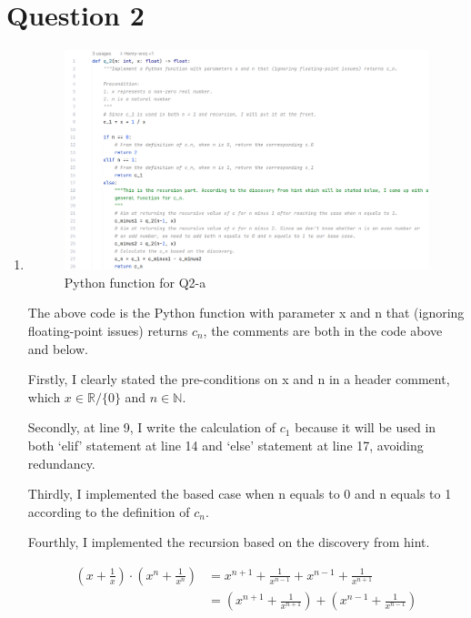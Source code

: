 \documentclass[12pt]{article}
\begin{document}
\section{Question 2}
\begin{enumerate}[label=(\alph*)]
    \item
\begin{figure}[h]
    \centering
    \includegraphics[width = 1.0\textwidth]{tex_pic/q2_3.png}
    \caption{Python function for Q2-a}
\end{figure}

\noindent The above code is the Python function with parameter x and n that (ignoring floating-point issues) returns $c_n$, the comments are both in the code above and below.

\noindent Firstly, I clearly stated the pre-conditions on x and n in a header comment, which $x \in \mathbb{R} / \{0\} $ and $n \in \mathbb{N}$.

\noindent Secondly, at line 9, I write the calculation of $c_1$ because it will be used in both `elif' statement at line 14 and `else' statement at line 17, avoiding redundancy.

\noindent Thirdly, I implemented the based case when n equals to 0 and n equals to 1 according to the definition of $c_n$.

\noindent Fourthly, I implemented the recursion based on the discovery from hint.

\begin{align*}
    (x + \frac{1}{x}) \cdot (x^n + \frac{1}{x^n}) &= x^{n+1} + \frac{1}{x^{n-1}} + x^{n-1} + \frac{1}{x^{n+1}} \\
    &= (x^{n+1} + \frac{1}{x^{n+1}}) + (x^{n-1} + \frac{1}{x^{n-1}})
\end{align*}


\end{enumerate}
\end{document}
